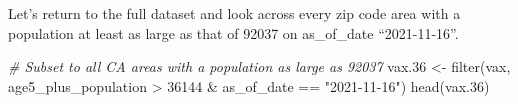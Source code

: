 \documentclass[
]{article}
\newenvironment{Shaded}{\begin{snugshade}}{\end{snugshade}}
\newcommand{\CommentTok}[1]{\textcolor[rgb]{0.56,0.35,0.01}{\textit{#1}}}
\newcommand{\DecValTok}[1]{\textcolor[rgb]{0.00,0.00,0.81}{#1}}
\newcommand{\FloatTok}[1]{\textcolor[rgb]{0.00,0.00,0.81}{#1}}
\newcommand{\FunctionTok}[1]{\textcolor[rgb]{0.00,0.00,0.00}{#1}}
\newcommand{\NormalTok}[1]{#1}
\newcommand{\OtherTok}[1]{\textcolor[rgb]{0.56,0.35,0.01}{#1}}
\newcommand{\SpecialCharTok}[1]{\textcolor[rgb]{0.00,0.00,0.00}{#1}}
\newcommand{\StringTok}[1]{\textcolor[rgb]{0.31,0.60,0.02}{#1}}
\begin{document}
Let's return to the full dataset and look across every zip code area
with a population at least as large as that of 92037 on as\_of\_date
``2021-11-16''.

\begin{Shaded}
\begin{Highlighting}[]
\CommentTok{\# Subset to all CA areas with a population as large as 92037}
\NormalTok{vax}\FloatTok{.36} \OtherTok{\textless{}{-}} \FunctionTok{filter}\NormalTok{(vax, age5\_plus\_population }\SpecialCharTok{\textgreater{}} \DecValTok{36144} \SpecialCharTok{\&}
\NormalTok{                as\_of\_date }\SpecialCharTok{==} \StringTok{"2021{-}11{-}16"}\NormalTok{)}
\FunctionTok{head}\NormalTok{(vax}\FloatTok{.36}\NormalTok{)}
\end{Highlighting}
\end{Shaded}
\end{document}
